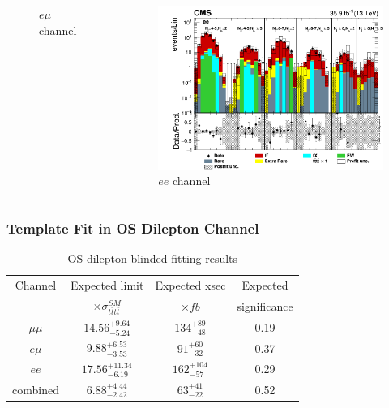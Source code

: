 \documentclass{beamer}
\begin{document}
\begin{frame}
\begin{columns}
\begin{figure}
		\caption{$e \mu$ channel}
	\end{figure}
	\begin{figure} \vspace{-10pt}
		\includegraphics[width=0.8\linewidth]{hist_elel_log.png}
		\caption{$ee$ channel}
	\end{figure}
\end{columns}
\end{frame}


\begin{frame}
\frametitle{Template Fit in OS Dilepton Channel}
\vspace{-10pt} 
\begin{table}
\caption{OS dilepton blinded fitting results}
\vspace{0pt} 
\begin{tabular}{| c | c | c | c |}
\hline
Channel	&Expected limit	&Expected xsec	&Expected \\
 & $\times \sigma_{t\bar{t}t\bar{t}}^{SM}$ &  $\times fb$ &significance \\
\hline
$\mu \mu$	&$14.56_{-5.24}^{+9.64}$ &$134_{-48}^{+89}$ &0.19  \\
\hline
$e \mu$		&$9.88_{-3.53}^{+6.53}$ &$91_{-32}^{+60}$ &0.37  \\
\hline
$ee$			&$17.56_{-6.19}^{+11.34}$ &$162_{-57}^{+104}$ &0.29  \\
\hline
combined		&$6.88_{-2.42}^{+4.44}$ &$63_{-22}^{+41}$ &0.52  \\
\hline
\end{tabular} 
\end{table}
\end{frame}

\end{document}
